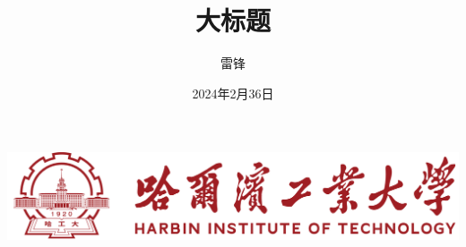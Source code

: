 \documentclass[serif,11pt]{beamer}
\title[{} \hspace{5.2cm} \insertframenumber/\inserttotalframenumber]{{大标题 }}
\author[大标题 \hspace{18pt} {2024.4.30}]{{雷锋}}
\date{2024年2月36日}
\institute{深圳工业大学（哈尔滨） \\ \vspace{7pt} 航天学院\hspace{10pt}XXX研究所}
\begin{document}
\begin{frame}
  \begin{center}
    \vspace{0.1cm}
    \includegraphics[scale=0.20]{HITlogo.png}
  \end{center}
  \titlepage
\end{frame}

















\end{document}

